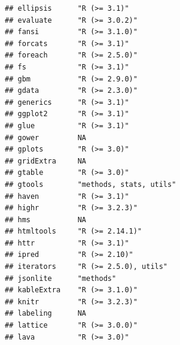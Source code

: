 \documentclass[]{article}
\begin{document}
\begin{verbatim}
## ellipsis      "R (>= 3.1)"                                                             
## evaluate      "R (>= 3.0.2)"                                                           
## fansi         "R (>= 3.1.0)"                                                           
## forcats       "R (>= 3.1)"                                                             
## foreach       "R (>= 2.5.0)"                                                           
## fs            "R (>= 3.1)"                                                             
## gbm           "R (>= 2.9.0)"                                                           
## gdata         "R (>= 2.3.0)"                                                           
## generics      "R (>= 3.1)"                                                             
## ggplot2       "R (>= 3.1)"                                                             
## glue          "R (>= 3.1)"                                                             
## gower         NA                                                                       
## gplots        "R (>= 3.0)"                                                             
## gridExtra     NA                                                                       
## gtable        "R (>= 3.0)"                                                             
## gtools        "methods, stats, utils"                                                  
## haven         "R (>= 3.1)"                                                             
## highr         "R (>= 3.2.3)"                                                           
## hms           NA                                                                       
## htmltools     "R (>= 2.14.1)"                                                          
## httr          "R (>= 3.1)"                                                             
## ipred         "R (>= 2.10)"                                                            
## iterators     "R (>= 2.5.0), utils"                                                    
## jsonlite      "methods"                                                                
## kableExtra    "R (>= 3.1.0)"                                                           
## knitr         "R (>= 3.2.3)"                                                           
## labeling      NA                                                                       
## lattice       "R (>= 3.0.0)"                                                           
## lava          "R (>= 3.0)"                                                             

\end{verbatim}
\end{document}
